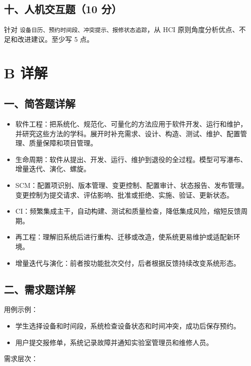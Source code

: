 \documentclass[UTF8,zihao=-4]{ctexart}
\begin{document}
\subsection{十、人机交互题（10 分）}


针对 \texttt{设备日历、预约时间段、冲突提示、报修状态追踪}，从 HCI 原则角度分析优点、不足和改进建议。至少写 5 点。


\section{B 详解}


\subsection{一、简答题详解}


\begin{itemize}
\item 软件工程：把系统化、规范化、可量化的方法应用于软件开发、运行和维护，并研究这些方法的学科。展开时补充需求、设计、构造、测试、维护、配置管理、质量保障和项目管理。
\item 生命周期：软件从提出、开发、运行、维护到退役的全过程。模型可写瀑布、增量迭代、演化、螺旋。
\item SCM：配置项识别、版本管理、变更控制、配置审计、状态报告、发布管理。变更控制为提交请求、评估影响、批准或拒绝、实施、验证、更新状态。
\item CI：频繁集成主干，自动构建、测试和质量检查，降低集成风险，缩短反馈周期。
\item 再工程：理解旧系统后进行重构、迁移或改造，使系统更易维护或适配新环境。
\item 增量迭代与演化：前者按功能批次交付，后者根据反馈持续改变系统形态。
\end{itemize}



\subsection{二、需求题详解}


用例示例：


\begin{itemize}
\item 学生选择设备和时间段，系统检查设备状态和时间冲突，成功后保存预约。
\item 用户提交报修单，系统记录故障并通知实验室管理员和维修人员。
\end{itemize}


需求层次：
\end{document}

